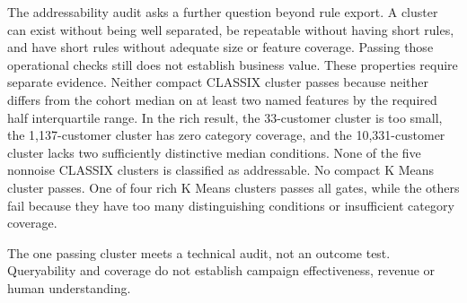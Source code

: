 The addressability audit asks a further question beyond rule export. A cluster can exist without being well separated, be repeatable without having short rules, and have short rules without adequate size or feature coverage. Passing those operational checks still does not establish business value. These properties require separate evidence. Neither compact CLASSIX cluster passes because neither differs from the cohort median on at least two named features by the required half interquartile range. In the rich result, the 33-customer cluster is too small, the 1,137-customer cluster has zero category coverage, and the 10,331-customer cluster lacks two sufficiently distinctive median conditions. None of the five nonnoise CLASSIX clusters is classified as addressable. No compact K Means cluster passes. One of four rich K Means clusters passes all gates, while the others fail because they have too many distinguishing conditions or insufficient category coverage.

The one passing cluster meets a technical audit, not an outcome test. Queryability and coverage do not establish campaign effectiveness, revenue or human understanding.